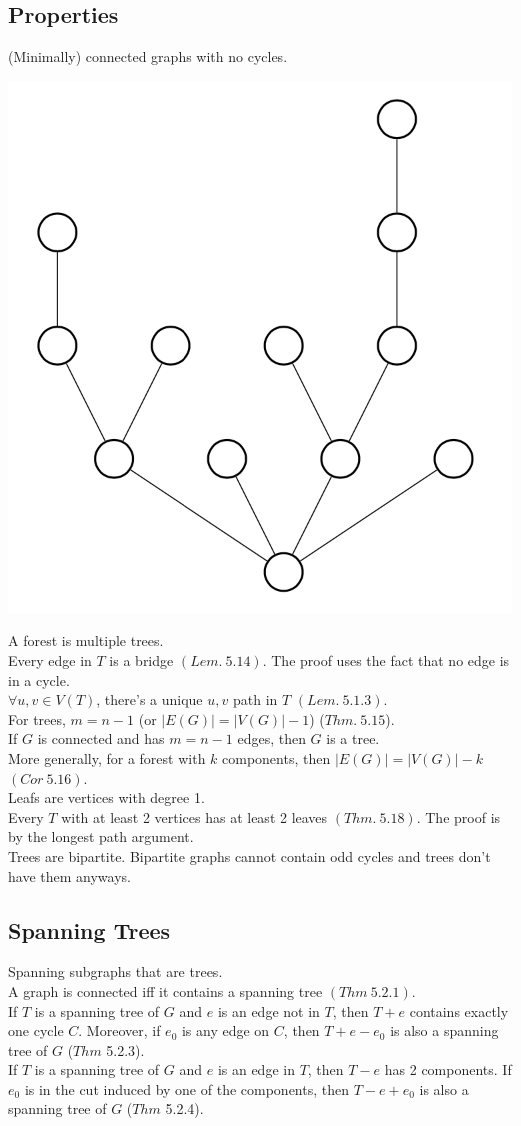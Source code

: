\documentclass[11pt]{article}
\newcommand{\nl}{\\[5pt]}
\begin{document}
\subsection{Properties}
(Minimally) connected graphs with no cycles.  
\begin{center}
    \includegraphics[scale=0.5]{Figures/Tree.png}
\end{center}
A forest is multiple trees. \nl
Every edge in $T$ is a bridge $(Lem. \: 5.14)$. The proof uses the fact that no edge is in a cycle. \nl
$\forall u, v \in V(T)$, there's a unique $u,v$ path in $T$ $(Lem. \: 5.1.3)$. \nl 
For trees, $m = n - 1$ (or $|E(G)| = |V(G)| - 1$) ($Thm. \: 5.15$). \nl 
If $G$ is connected and has $m = n- 1$ edges, then $G$ is a tree. \nl
More generally, for a forest with $k$ components, then $|E(G)| = |V(G)| - k$ $(Cor \: 5.16)$. \nl 
Leafs are vertices with degree 1. \nl 
Every $T$ with at least 2 vertices has at least 2 leaves $(Thm. \: 5.18)$. The proof is by the longest path argument. \nl 
Trees are bipartite. Bipartite graphs cannot contain odd cycles and trees don't have them anyways.
\subsection{Spanning Trees}
Spanning subgraphs that are trees. \nl 
A graph is connected iff it contains a spanning tree $(Thm \: 5.2.1)$. \nl
If $T$ is a spanning tree of $G$ and $e$ is an edge not in $T$, then $T+e$ contains exactly one cycle $C$. Moreover, if $e_0$ is any edge on $C$, then $T + e - e_0$ is also a spanning tree of $G$ ($Thm$ 5.2.3). \nl 
If $T$ is a spanning tree of $G$ and $e$ is an edge in $T$, then $T-e$ has 2 components. If $e_0$ is in the cut induced by one of the components, then $T - e + e_0$ is also a spanning tree of $G$ ($Thm$ 5.2.4). 
\end{document}
